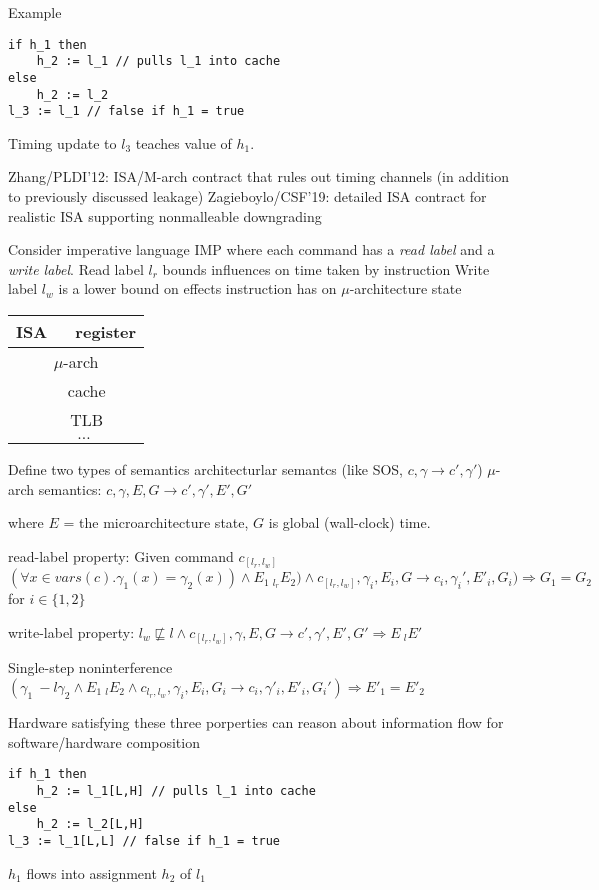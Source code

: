\documentclass{article}
\begin{document}
Example
\begin{lstlisting}[mathescape]
if h_1 then
    h_2 := l_1 // pulls l_1 into cache
else 
    h_2 := l_2
l_3 := l_1 // false if h_1 = true
\end{lstlisting}

Timing update to $l_3$ teaches value of $h_1$.

Zhang/PLDI'12: ISA/M-arch contract that rules out timing channels (in addition to previously discussed leakage)
Zagieboylo/CSF'19: detailed ISA contract for realistic ISA supporting nonmalleable downgrading

Consider imperative language IMP where each command has a \emph{read label} and a \emph{write label}.
Read label $l_r$ bounds influences on time taken by instruction
Write label $l_w$ is a lower bound on effects instruction has on $\mu$-architecture state
\begin{tabular}{|c|}
\hline
ISA
$\quad$ register \\
\hline
$\mu$-arch \\
$\quad$ cache \\
$\quad$ TLB \\
$\quad \ldots$ \\
\hline
\end{tabular}

Define two types of semantics
architecturlar semantcs (like SOS, $c,\gamma \longrightarrow c',\gamma'$)
$\mu$-arch semantics: $c,\gamma,E,G \longrightarrow c',\gamma',E',G'$

where $E$ =  the microarchitecture state, $G$ is global (wall-clock) time.
 
read-label property: Given command $c_[l_r,l_w]$
$(\forall x \in vars(c) . \gamma_1(x) = \gamma_2(x)) \land E_1 ~_{l_r} E_2) \land c_[l_r,l_w],\gamma_i,E_i,G \longrightarrow c_i,\gamma_i',E'_i,G_i)  \Rightarrow G_1 = G_2$ for $i \in 
\{1,2\}$

write-label property: $l_w \not\sqsubseteq l \land c_{[l_r,l_w]}, \gamma,E,G \longrightarrow c', \gamma',E',G' \Rightarrow E ~_l E' $

Single-step noninterference
$(\gamma_1 ~-l \gamma_2 \land E_1 ~_l E_2 \land c_{l_r,l_w},\gamma_i,E_i,G_i \longrightarrow c_i,\gamma'_i,E'_i,G_i') \Rightarrow E'_1 = E'_2$

Hardware satisfying these three porperties can reason about information flow for software/hardware composition

\begin{lstlisting}[mathescape]
if h_1 then
    h_2 := l_1[L,H] // pulls l_1 into cache
else 
    h_2 := l_2[L,H]
l_3 := l_1[L,L] // false if h_1 = true
\end{lstlisting}
$h_1$ flows into assignment $h_2$ of $l_1$
\end{document}
